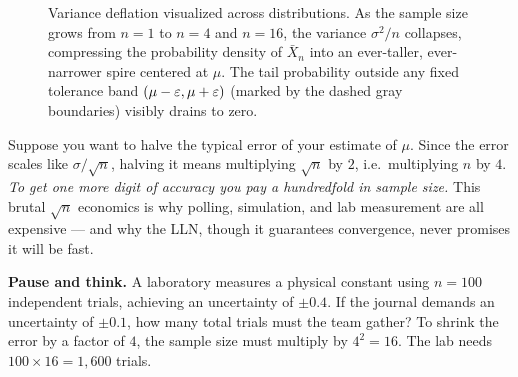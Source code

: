 \begin{figure}[H]
\centering
{}
\caption{Variance deflation visualized across distributions. As the sample size grows from $n=1$ to $n=4$ and $n=16$, the variance $\sigma^2/n$ collapses, compressing the probability density of $\bar X_n$ into an ever-taller, ever-narrower spire centered at $\mu$. The tail probability outside any fixed tolerance band $(\mu-\varepsilon, \mu+\varepsilon)$ (marked by the dashed gray boundaries) visibly drains to zero.}
\label{ch20:fig-densities}
\end{figure}

\begin{walkbox}
Suppose you want to halve the typical error of your estimate of $\mu$. Since the error scales like $\sigma/\sqrt n$, halving it means multiplying $\sqrt n$ by $2$, i.e.\ multiplying $n$ by $4$. \emph{To get one more digit of accuracy you pay a hundredfold in sample size.} This brutal $\sqrt n$ economics is why polling, simulation, and lab measurement are all expensive --- and why the LLN, though it guarantees convergence, never promises it will be fast.
\end{walkbox}

\begin{recoverybox}
\textbf{Pause and think.} A laboratory measures a physical constant using $n = 100$ independent trials, achieving an uncertainty of $\pm 0.4$. If the journal demands an uncertainty of $\pm 0.1$, how many total trials must the team gather? To shrink the error by a factor of $4$, the sample size must multiply by $4^2 = 16$. The lab needs $100 \times 16 = 1{,}600$ trials.
\end{recoverybox}

